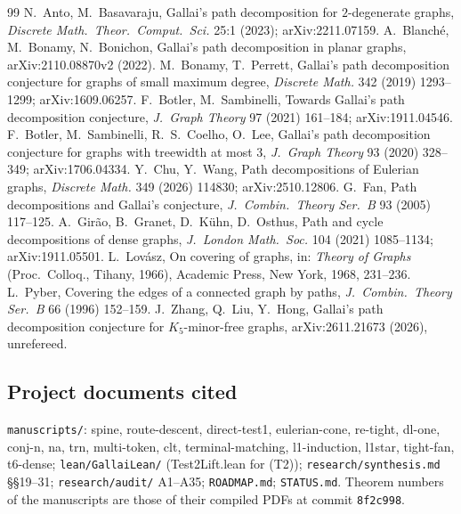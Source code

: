 \documentclass[11pt]{amsart}
\theoremstyle{definition}
\begin{document}
\begin{thebibliography}{99}
 N.~Anto, M.~Basavaraju, Gallai's path decomposition for $2$-degenerate graphs,
\emph{Discrete Math.\ Theor.\ Comput.\ Sci.} 25:1 (2023); arXiv:2211.07159.
 A.~Blanch\'e, M.~Bonamy, N.~Bonichon, Gallai's path decomposition in planar graphs,
arXiv:2110.08870v2 (2022).
 M.~Bonamy, T.~Perrett, Gallai's path decomposition conjecture for graphs of small maximum
degree, \emph{Discrete Math.} 342 (2019) 1293--1299; arXiv:1609.06257.
 F.~Botler, M.~Sambinelli, Towards Gallai's path decomposition conjecture, \emph{J.\ Graph
Theory} 97 (2021) 161--184; arXiv:1911.04546.
 F.~Botler, M.~Sambinelli, R.~S.~Coelho, O.~Lee, Gallai's path decomposition conjecture for
graphs with treewidth at most 3, \emph{J.\ Graph Theory} 93 (2020) 328--349; arXiv:1706.04334.
 Y.~Chu, Y.~Wang, Path decompositions of Eulerian graphs, \emph{Discrete Math.} 349 (2026)
114830; arXiv:2510.12806.
 G.~Fan, Path decompositions and Gallai's conjecture, \emph{J.\ Combin.\ Theory Ser.~B}
93 (2005) 117--125.
 A.~Gir\~ao, B.~Granet, D.~K\"uhn, D.~Osthus, Path and cycle decompositions of dense
graphs, \emph{J.\ London Math.\ Soc.} 104 (2021) 1085--1134; arXiv:1911.05501.
 L.~Lov\'asz, On covering of graphs, in: \emph{Theory of Graphs} (Proc.\ Colloq., Tihany,
1966), Academic Press, New York, 1968, 231--236.
 L.~Pyber, Covering the edges of a connected graph by paths, \emph{J.\ Combin.\ Theory
Ser.~B} 66 (1996) 152--159.
 J.~Zhang, Q.~Liu, Y.~Hong, Gallai's path decomposition conjecture for $K_5$-minor-free
graphs, arXiv:2611.21673 (2026), unrefereed.
\end{thebibliography}

\subsection*{Project documents cited}
\texttt{manuscripts/}: spine, route-descent, direct-test1, eulerian-cone, re-tight, dl-one, conj-n, na,
trn, multi-token, clt, terminal-matching, l1-induction, l1star, tight-fan, t6-dense; \texttt{lean/GallaiLean/}
(Test2Lift.lean for (T2)); \texttt{research/synthesis.md} \S\S19--31; \texttt{research/audit/} A1--A35;
\texttt{ROADMAP.md}; \texttt{STATUS.md}. Theorem numbers of the manuscripts are those of their compiled PDFs
at commit \texttt{8f2c998}.
\end{document}
